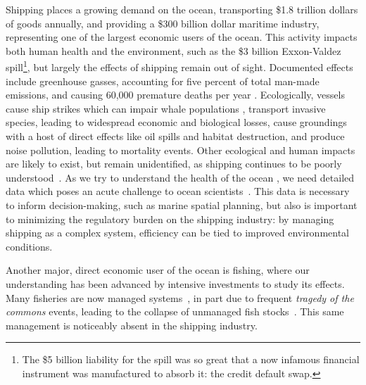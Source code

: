 Shipping places a growing demand on the ocean, transporting \$1.8 trillion dollars of goods annually, %
and providing a \$300 billion dollar maritime industry, representing one of the largest economic users of the ocean. This activity impacts both human health and the environment, such as the \$3 billion Exxon-Valdez spill\footnote{The \$5 billion liability for the spill was so great that a now infamous financial instrument was manufactured to absorb it: the credit default swap.}, but largely the effects of shipping remain out of sight. Documented effects include greenhouse gasses, accounting for five percent of total man-made emissions, and causing 60,000 premature deaths per year \citep{Corbett2007}. Ecologically, vessels cause ship strikes which can impair whale populations \citep{Fujiwara2001}, %
 transport invasive species, leading to widespread economic and biological losses, cause groundings with a host of direct effects like oil spills and habitat destruction, and produce noise pollution, leading to mortality events. Other ecological and human impacts are likely to exist, but remain unidentified, as shipping continues to be poorly understood~\citep{Davenport2006}. As we try to understand the health of the ocean \citep{Halpern2012}, we need detailed data which poses an acute challenge to ocean scientists~\citep{Wright1997}. This data is necessary to inform decision-making, such as marine spatial planning, but also is important to minimizing the regulatory burden on the shipping industry: by managing shipping as a complex system, efficiency can be tied to improved environmental conditions.


Another major, direct economic user of the ocean is fishing, where our understanding has been advanced by intensive investments to study its effects. %
Many fisheries are now managed systems~\citep{worm2009rebuilding}, in part due to frequent \textit{tragedy of the commons} events, leading to the collapse of unmanaged fish stocks~\citep{costello2012status}. %
This same management is noticeably absent in the shipping industry.

